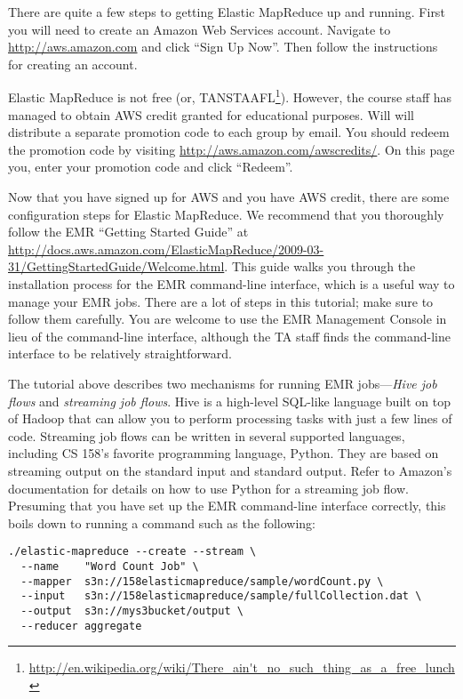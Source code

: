 \documentclass[10pt]{article}
\begin{document}
There are quite a few steps to getting Elastic MapReduce up and running. First you will
need to create an Amazon Web Services account. Navigate to \url{http://aws.amazon.com} and
click ``Sign Up Now''. Then follow the instructions for creating an account.

Elastic MapReduce is not free (or, TANSTAAFL\footnote{\url{http://en.wikipedia.org/wiki/There_ain't_no_such_thing_as_a_free_lunch}}).
However, the course staff has managed to obtain AWS credit granted for educational purposes. Will will distribute a separate
promotion code to each group by email. You should redeem the promotion code by visiting \url{http://aws.amazon.com/awscredits/}. On this page
you, enter your promotion code and click ``Redeem''.

Now that you have signed up for AWS and you have AWS credit, there are some configuration steps for
Elastic MapReduce. We recommend that you thoroughly follow the EMR ``Getting Started Guide'' at
\url{http://docs.aws.amazon.com/ElasticMapReduce/2009-03-31/GettingStartedGuide/Welcome.html}.
This guide walks you through the installation process for the EMR command-line interface, which is a useful way to manage
your EMR jobs. There are a lot of steps in this tutorial; make sure to follow them carefully.
You are welcome to use the EMR Management Console in lieu of the command-line
interface, although the TA staff finds the command-line interface to be relatively straightforward.

The tutorial above describes two mechanisms for running EMR jobs---\textit{Hive job flows} and
\textit{streaming job flows}. Hive is a high-level SQL-like language built on top of Hadoop
that can allow you to perform processing tasks with just a few lines of code. Streaming job
flows can be written in several supported languages, including CS 158's favorite programming
language, Python. They are based on streaming output on the standard input and standard output.
Refer to Amazon's documentation for details on how to use Python for a streaming job
flow. Presuming that you have set up the EMR command-line interface correctly,
this boils down to running a command such as the following:

\begin{verbatim}
./elastic-mapreduce --create --stream \
  --name    "Word Count Job" \
  --mapper  s3n://158elasticmapreduce/sample/wordCount.py \
  --input   s3n://158elasticmapreduce/sample/fullCollection.dat \
  --output  s3n://mys3bucket/output \
  --reducer aggregate 
\end{verbatim}
\end{document}
